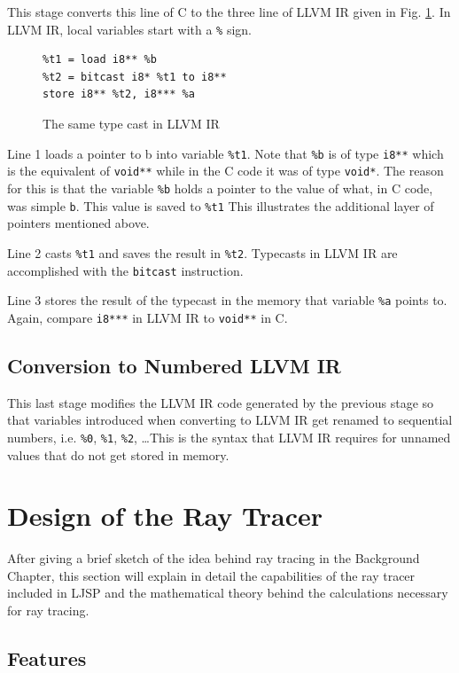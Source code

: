 \documentclass[11pt]{report}
\begin{document}
This stage converts this line of C to the three line of LLVM IR given in Fig. \ref{convllvmir2}. In LLVM IR, local variables start with a \texttt{\%} sign. 

\begin{figure}[ht]
\begin{lstlisting}
%t1 = load i8** %b
%t2 = bitcast i8* %t1 to i8**
store i8** %t2, i8*** %a
\end{lstlisting}
\caption{The same type cast in LLVM IR}
\label{convllvmir2}
\end{figure}

Line 1 loads a pointer to b into variable \texttt{\%t1}. Note that \texttt{\%b} is of type \texttt{i8**} which is the equivalent of \texttt{void**} while in the C code it was of type \texttt{void*}. The reason for this is that the variable \texttt{\%b} holds a pointer to the value of what, in C code, was simple \texttt{b}. This value is saved to \texttt{\%t1} This illustrates the additional layer of pointers mentioned above.

Line 2 casts \texttt{\%t1} and saves the result in \texttt{\%t2}. Typecasts in LLVM IR are accomplished with the \texttt{bitcast} instruction.

Line 3 stores the result of the typecast in the memory that variable \texttt{\%a} points to. Again, compare \texttt{i8***} in LLVM IR to \texttt{void**} in C.

\subsection{Conversion to Numbered LLVM IR}
This last stage modifies the LLVM IR code generated by the previous stage so that variables introduced when converting to LLVM IR get renamed to sequential numbers, i.e. \texttt{\%0}, \texttt{\%1}, \texttt{\%2}, \dots This is the syntax that LLVM IR requires for unnamed values that do not get stored in memory.

\section{Design of the Ray Tracer}
After giving a brief sketch of the idea behind ray tracing in the Background Chapter, this section will explain in detail the capabilities of the ray tracer included in LJSP and the mathematical theory behind the calculations necessary for ray tracing.

\subsection{Features}
\end{document}
